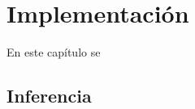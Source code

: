 \chapter{Implementación}\label{implementacion}

En este capítulo se 

\section{Inferencia}\label{sec:inferencia}

